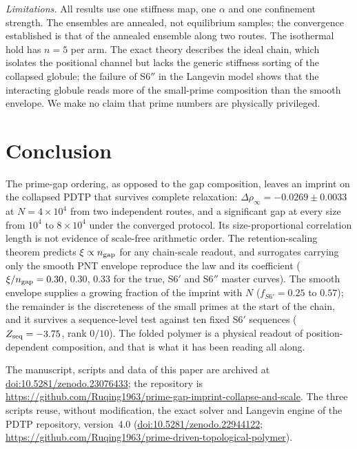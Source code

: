 \documentclass[reprint,amsmath,amssymb,aps,pre,longbibliography]{revtex4-2}
\begin{document}
\emph{Limitations.} All results use one stiffness map, one $\alpha$ and one confinement
strength. The ensembles are annealed, not equilibrium samples; the convergence established
is that of the annealed ensemble along two routes. The isothermal hold has $n=5$ per arm.
The exact theory describes the ideal chain, which isolates the positional channel but lacks
the generic stiffness sorting of the collapsed globule; the failure of S6$''$ in the Langevin
model shows that the interacting globule reads more of the small-prime composition than the
smooth envelope. We make no claim that prime numbers are physically privileged.

\section{Conclusion}

The prime-gap ordering, as opposed to the gap composition, leaves an imprint on the
collapsed PDTP that survives complete relaxation: $\Delta\rho_\infty=-0.0269\pm0.0033$ at
$N=4\times10^{4}$ from two independent routes, and a significant gap at every size from
$10^{4}$ to $8\times10^{4}$ under the converged protocol. Its size-proportional correlation
length is not evidence of scale-free arithmetic order. The retention-scaling theorem predicts
$\xi\propto n_{\rm gap}$ for any chain-scale readout, and surrogates carrying only the smooth
PNT envelope reproduce the law and its coefficient ($\xi/n_{\rm gap}=0.30$, $0.30$, $0.33$ for
the true, S6$'$ and S6$''$ master curves). The smooth envelope supplies a growing fraction
of the imprint with $N$ ($f_{S6'}=0.25$ to $0.57$); the remainder is the discreteness of the
small primes at the start of the chain, and it survives a sequence-level test against ten
fixed S6$'$ sequences ($Z_{\rm seq}=-3.75$, rank $0/10$). The folded polymer is a physical readout of
position-dependent composition, and that is what it has been reading all along.

\begin{acknowledgments}
\sloppy
The manuscript, scripts and data of this paper are archived at
\href{https://doi.org/10.5281/zenodo.23076433}{doi:10.5281/zenodo.23076433}; the repository is
\url{https://github.com/Ruqing1963/prime-gap-imprint-collapse-and-scale}.
The three scripts reuse, without modification, the exact solver and Langevin engine of the
PDTP repository, version~4.0
(\href{https://doi.org/10.5281/zenodo.22944122}{doi:10.5281/zenodo.22944122};
\url{https://github.com/Ruqing1963/prime-driven-topological-polymer}).
\end{acknowledgments}
\end{document}
